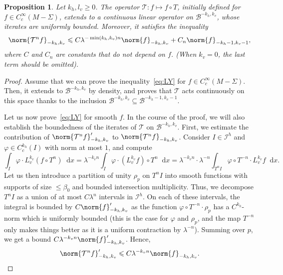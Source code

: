 \documentclass[11pt, a4paper, oneside, final, pagebackref]{amsart}
\newcommand{\boI}{\mathcal{I}}
\newcommand{\boB}{\mathcal{B}}
\newcommand{\boT}{\mathcal{T}}
\newcommand{\dd}{\mathop{}\!\mathrm{d}}
\renewcommand{\phi}{\varphi}
\renewcommand{\leq}{\leqslant}
\renewcommand{\geq}{\geqslant}
\newtheorem{prop}[thm]{Proposition}
\theoremstyle{definition}
\numberwithin{equation}{section}
\begin{document}
\begin{prop}
\label{prop:LY} Let $k_h, l_v \geq 0$. The operator $\boT : f \mapsto f \circ
T$, initially defined for $f \in C^\infty_c(M-\Sigma)$, extends to a
continuous linear operator on $\boB^{-k_h, k_v}$, whose iterates are
uniformly bounded. Moreover, it satisfies the inequality
\begin{equation}
\label{eq:LY}
  \norm{\boT^n f}_{-k_h, k_v} \leq C \lambda^{-\min(k_h, k_v) n} \norm{f}_{-k_h, k_v} + C_n \norm{f}_{-k_h-1, k_v-1},
\end{equation}
where $C$ and $C_n$ are constants that do not depend on $f$. (When $k_v=0$,
the last term should be omitted).
\end{prop}
\begin{proof}
Assume that we can prove the inequality~\eqref{eq:LY} for $f \in
C^\infty_c(M-\Sigma)$. Then, it extends to $\boB^{-k_h, k_v}$ by density, and
proves that $\boT$ acts continuously on this space thanks to the inclusion
$\boB^{-k_h, k_v} \subseteq \boB^{-k_h-1, k_v-1}$.

Let us now prove~\eqref{eq:LY} for smooth $f$. In the course of the proof, we
will also establish the boundedness of the iterates of $\boT$ on $\boB^{-k_h,
k_v}$. First, we estimate the contribution of $\norm{\boT^n f}'_{-k_h, k_v}$
to $\norm{\boT^n f}_{-k_h, k_v}$. Consider $I \in \boI^h$ and $\phi \in
C^{k_h}_c(I)$ with norm at most $1$, and compute
\begin{equation*}
  \int_I \phi \cdot L_v^{k_v}(f \circ T^n) \dd x
  = \lambda^{-k_v n} \int_I \phi \cdot (L_v^{k_v} f) \circ T^n \dd x
  = \lambda^{-k_v n} \cdot \lambda^{-n} \int_{T^n I} \phi \circ T^{-n} \cdot L_v^{k_v}f \dd x.
\end{equation*}
Let us then introduce a partition of unity $\rho_p$ on $T^n I$ into smooth
functions with supports of size $\leq \beta_0$ and bounded intersection
multiplicity. Thus, we decompose $T^n I$ as a union of at most $C \lambda^n$
intervals in $\boI^h$. On each of these intervals, the integral is bounded by
$C \norm{f}'_{-k_h, k_v}$ as the function $\phi \circ T^{-n} \cdot \rho_p$
has a $C^{k_h}$-norm which is uniformly bounded (this is the case for $\phi$
and $\rho_p$, and the map $T^{-n}$ only makes things better as it is a
uniform contraction by $\lambda^{-n}$). Summing over $p$, we get a bound $C
\lambda^{-k_v n} \norm{f}'_{-k_h, k_v}$. Hence,
\begin{equation}
\label{eq:ksprime}
  \norm{\boT^n f}'_{-k_h, k_v} \leq C \lambda^{-k_v n} \norm{f}_{-k_h, k_v}.
\end{equation}


\end{proof}
\end{document}
